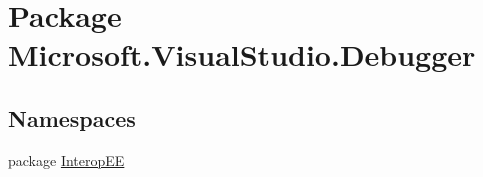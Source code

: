 \hypertarget{namespace_microsoft_1_1_visual_studio_1_1_debugger}{\section{Package Microsoft.\+Visual\+Studio.\+Debugger}
\label{namespace_microsoft_1_1_visual_studio_1_1_debugger}
}
\subsection*{Namespaces}
\begin{DoxyCompactItemize}
\item 
package \hyperlink{namespace_microsoft_1_1_visual_studio_1_1_debugger_1_1_interop_e_e}{Interop\+E\+E}
\end{DoxyCompactItemize}
